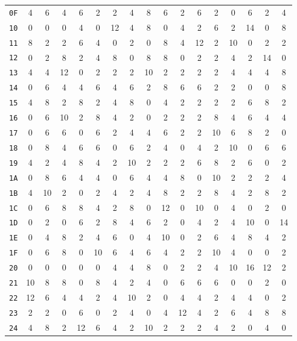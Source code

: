 \begin{center}
\begin{small}
\begin{longtable}{c|cccccccccccccccc}
\texttt{0F} & 4 & 6 & 4 & 6 & 2 & 2 & 4 & 8 & 6 & 2 & 6 & 2 & 0 & 6 & 2 & 4 \\
\texttt{10} & 0 & 0 & 0 & 4 & 0 & 12 & 4 & 8 & 0 & 4 & 2 & 6 & 2 & 14 & 0 & 8 \\
\texttt{11} & 8 & 2 & 2 & 6 & 4 & 0 & 2 & 0 & 8 & 4 & 12 & 2 & 10 & 0 & 2 & 2 \\
\texttt{12} & 0 & 2 & 8 & 2 & 4 & 8 & 0 & 8 & 8 & 0 & 2 & 2 & 4 & 2 & 14 & 0 \\
\texttt{13} & 4 & 4 & 12 & 0 & 2 & 2 & 2 & 10 & 2 & 2 & 2 & 2 & 4 & 4 & 4 & 8 \\
\texttt{14} & 0 & 6 & 4 & 4 & 6 & 4 & 6 & 2 & 8 & 6 & 6 & 2 & 2 & 0 & 0 & 8 \\
\texttt{15} & 4 & 8 & 2 & 8 & 2 & 4 & 8 & 0 & 4 & 2 & 2 & 2 & 2 & 6 & 8 & 2 \\
\texttt{16} & 0 & 6 & 10 & 2 & 8 & 4 & 2 & 0 & 2 & 2 & 2 & 8 & 4 & 6 & 4 & 4 \\
\texttt{17} & 0 & 6 & 6 & 0 & 6 & 2 & 4 & 4 & 6 & 2 & 2 & 10 & 6 & 8 & 2 & 0 \\
\texttt{18} & 0 & 8 & 4 & 6 & 6 & 0 & 6 & 2 & 4 & 0 & 4 & 2 & 10 & 0 & 6 & 6 \\
\texttt{19} & 4 & 2 & 4 & 8 & 4 & 2 & 10 & 2 & 2 & 2 & 6 & 8 & 2 & 6 & 0 & 2 \\
\texttt{1A} & 0 & 8 & 6 & 4 & 4 & 0 & 6 & 4 & 4 & 8 & 0 & 10 & 2 & 2 & 2 & 4 \\
\texttt{1B} & 4 & 10 & 2 & 0 & 2 & 4 & 2 & 4 & 8 & 2 & 2 & 8 & 4 & 2 & 8 & 2 \\
\texttt{1C} & 0 & 6 & 8 & 8 & 4 & 2 & 8 & 0 & 12 & 0 & 10 & 0 & 4 & 0 & 2 & 0 \\
\texttt{1D} & 0 & 2 & 0 & 6 & 2 & 8 & 4 & 6 & 2 & 0 & 4 & 2 & 4 & 10 & 0 & 14 \\
\texttt{1E} & 0 & 4 & 8 & 2 & 4 & 6 & 0 & 4 & 10 & 0 & 2 & 6 & 4 & 8 & 4 & 2 \\
\texttt{1F} & 0 & 6 & 8 & 0 & 10 & 6 & 4 & 6 & 4 & 2 & 2 & 10 & 4 & 0 & 0 & 2 \\
\texttt{20} & 0 & 0 & 0 & 0 & 0 & 4 & 4 & 8 & 0 & 2 & 2 & 4 & 10 & 16 & 12 & 2 \\
\texttt{21} & 10 & 8 & 8 & 0 & 8 & 4 & 2 & 4 & 0 & 6 & 6 & 6 & 0 & 0 & 2 & 0 \\
\texttt{22} & 12 & 6 & 4 & 4 & 2 & 4 & 10 & 2 & 0 & 4 & 4 & 2 & 4 & 4 & 0 & 2 \\
\texttt{23} & 2 & 2 & 0 & 6 & 0 & 2 & 4 & 0 & 4 & 12 & 4 & 2 & 6 & 4 & 8 & 8 \\
\texttt{24} & 4 & 8 & 2 & 12 & 6 & 4 & 2 & 10 & 2 & 2 & 2 & 4 & 2 & 0 & 4 & 0 \\

\end{longtable}
\end{small}
\end{center}
